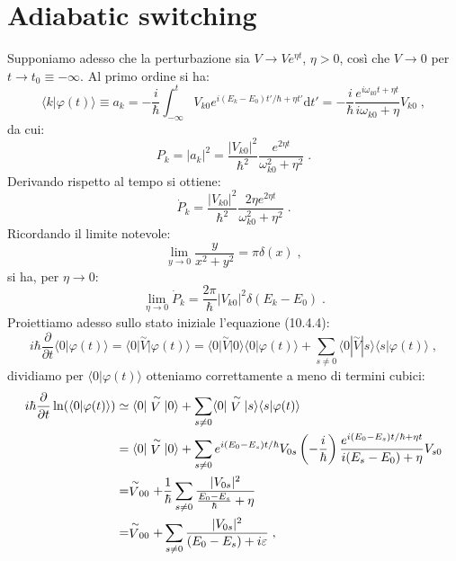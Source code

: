 \documentclass[12pt,a4paper]{report}
\theoremstyle{definition}
\numberwithin{equation}{section}
\newcommand{\diff}[1][]{\mathrm{d}#1}
\newcommand{\bra}{\langle}
\newcommand{\ket}{\rangle}
\begin{document}
\section{Adiabatic switching}
Supponiamo adesso che la perturbazione sia $V\to Ve^{\eta t}$, $\eta>0$, così che $V\to 0$ per $t\to t_0\equiv -\infty$. Al primo ordine si ha:
\begin{equation}
\bra k|\varphi(t)\ket\equiv a_k=-\frac{i}{\hbar}\int_{-\infty}^t V_{k0}e^{i(E_k-E_0)t'/\hbar+\eta t'}\diff{t}'=
-\frac{i}{\hbar}\frac{e^{i\omega_{k0}t+\eta t}}{i\omega_{k0}+\eta}V_{k0}\;,
\end{equation}
da cui:
\begin{equation}
P_k=|a_k|^2=\frac{|V_{k0}|^2}{\hbar^2}\frac{e^{2\eta t}}{\omega_{k0}^2+\eta^2}\;.
\end{equation}
Derivando rispetto al tempo si ottiene:
\begin{equation}
\dot{P}_k=\frac{|V_{k0}|^2}{\hbar^2}\frac{2\eta e^{2\eta t}}{\omega_{k0}^2+\eta^2}\;.
\end{equation}
Ricordando il limite notevole:
\begin{equation}
\lim_{y\to 0}\frac{y}{x^2+y^2}=\pi\delta(x)\;,
\end{equation}
si ha, per $\eta\to 0$:
\begin{equation}
\lim_{\eta\to 0}\dot{P}_k=\frac{2\pi}{\hbar}|V_{k0}|^2\delta(E_k-E_0)\;.
\end{equation}
Proiettiamo adesso sullo stato iniziale l'equazione (10.4.4):
\begin{equation}
i\hbar\frac{\partial}{\partial t}\bra 0|\varphi(t)\ket=\bra 0|\stackrel{\sim}{V}|\varphi(t)\ket=
\bra 0|\stackrel{\sim}{V}|0\ket\bra 0|\varphi(t)\ket+\sum_{s\ne 0}\bra 0|\stackrel{\sim}{V}|s\ket\bra s|\varphi(t)\ket\;,
\end{equation}
dividiamo per $\bra 0|\varphi(t)\ket$ otteniamo correttamente a meno di termini cubici:
\begin{align}
i\hbar\frac{\partial}{\partial t}\ln(\bra 0|\varphi(t)\ket)&\simeq \bra 0|\stackrel{\sim}{V}|0\ket+\sum_{s\ne 0}\bra 0|\stackrel{\sim}{V}|s\ket\bra s|\varphi(t)\ket \notag \\
&=\bra 0|\stackrel{\sim}{V}|0\ket+\sum_{s\ne 0}e^{i(E_0-E_s)t/\hbar}V_{0s}\left(-\frac{i}{\hbar}\right)\frac{e^{i(E_0-E_s)t/\hbar+\eta t}}{i(E_s-E_0)+\eta}V_{s0} \notag \\
&=\stackrel{\sim}{V}_{00}+\frac{1}{\hbar}\sum_{s\ne 0}\frac{|V_{0s}|^2}{\frac{E_0-E_s}{\hbar}+\eta} \notag \\
&=\stackrel{\sim}{V}_{00}+\sum_{s\ne 0}\frac{|V_{0s}|^2}{(E_0-E_s)+i\varepsilon}\;,
\end{align}
\end{document}

